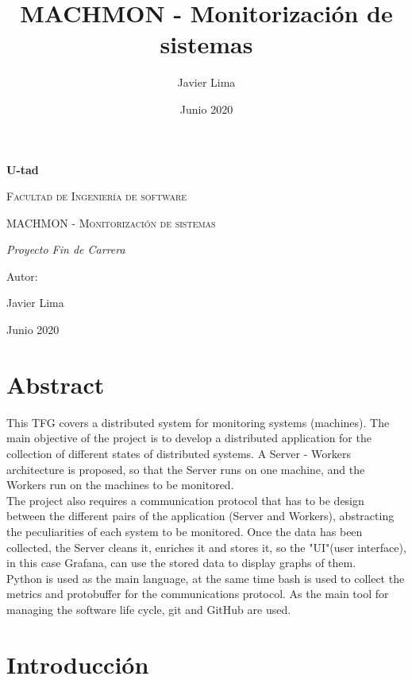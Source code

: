 \documentclass[ spanish, a4paper, 12pt, oneside]{report}
\title{\Huge MACHMON - Monitorización de sistemas }
\author{Javier Lima}
\date{Junio 2020}
\begin{document}
\begin{titlepage}
   \centering
   {\bfseries\LARGE U-tad \par}
   \vspace{1cm}
   {\scshape\Large Facultad de Ingeniería de software \par}
   \vspace{3cm}
   {\scshape\Huge MACHMON - Monitorización de sistemas \par}
   \vspace{3cm}
   {\itshape\Large Proyecto Fin de Carrera \par}
   \vfill
   {\Large Autor: \par}
   {\Large Javier Lima \par}
   \vfill
   {\Large Junio 2020 \par}
\end{titlepage}

\tableofcontents{}
\listoffigures
\newpage

\chapter{Abstract}


This TFG covers a distributed system for monitoring systems (machines). The main objective of the project is to develop a distributed application for 
the collection of different states of distributed systems. A Server - Workers architecture is proposed, so that the Server runs on one machine, and the Workers 
run on the machines to be monitored. \\

The project also requires a communication protocol that has to be design between the different pairs of the application (Server and Workers), abstracting 
the peculiarities of each system to be monitored. Once the data has been collected, the Server cleans it, enriches it and stores it, so the "UI"(user interface), 
in this case Grafana, can use the stored data to display graphs of them. \\

Python is used as the main language, at the same time bash is used to collect the metrics and protobuffer for the communications protocol. As the main tool for 
managing the software life cycle, git and GitHub are used. \\

\chapter{Introducción}
\end{document}
